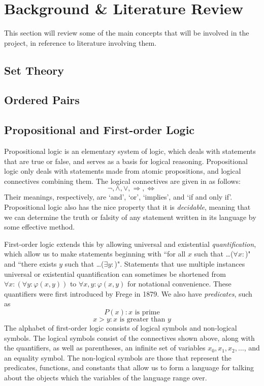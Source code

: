 \documentclass[11pt]{report}
\theoremstyle{definition}
\theoremstyle{theorem}
\theoremstyle{lemma}
\begin{document}
\chapter{Background \& Literature Review}
This section will review some of the main concepts that will be involved in the project, in reference to literature involving them.

\section{Set Theory}


\section{Ordered Pairs}

\section{Propositional and First-order Logic}
Propositional logic is an elementary system of logic, which deals with statements that are true or false, and serves as a basis for logical reasoning. Propositional logic only deals with statements made from atomic propositions, and logical connectives combining them. The logical connectives are given in \cite[p.~2]{beckert} as follows:
$$\neg, \wedge, \vee,\Rightarrow,\Leftrightarrow$$
Their meanings, respectively, are `and', `or', `implies', and `if and only if'.
Propositional logic also has the nice property that it is \emph{decidable}, meaning that we can determine the truth or falsity of any statement written in its language by some effective method.

First-order logic extends this by allowing universal and existential \emph{quantification}, which allow us to make statements beginning with ``for all $x$ such that \ldots ($\forall x:$)" and ``there exists $y$ such that \ldots ($\exists y:$)". Statements that use multiple instances universal or existential quantification can sometimes be shortened from $\forall x:(\forall y: \varphi(x,y))$ to $\forall x,y: \varphi(x,y)$ for notational convenience.
These quantifiers were first introduced by Frege \cite{frege} in 1879.
We also have \emph{predicates}, such as
$$P(x) : x \text{ is prime}$$
$$ x > y : x \text{ is greater than } y$$
\noindent
The alphabet of first-order logic consists of logical symbols and non-logical symbols.
The logical symbols consist of the connectives shown above, along with the quantifiers, as well as parentheses, an infinite set of variables $x_0, x_1, x_2,\ldots$, and an equality symbol.
The non-logical symbols are those that represent the predicates, functions, and constants that allow us to form a language for talking about the objects which the variables of the language range over.
\end{document}
